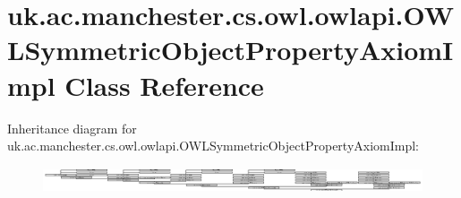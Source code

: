 \hypertarget{classuk_1_1ac_1_1manchester_1_1cs_1_1owl_1_1owlapi_1_1_o_w_l_symmetric_object_property_axiom_impl}{\section{uk.\-ac.\-manchester.\-cs.\-owl.\-owlapi.\-O\-W\-L\-Symmetric\-Object\-Property\-Axiom\-Impl Class Reference}
\label{classuk_1_1ac_1_1manchester_1_1cs_1_1owl_1_1owlapi_1_1_o_w_l_symmetric_object_property_axiom_impl}
}
Inheritance diagram for uk.\-ac.\-manchester.\-cs.\-owl.\-owlapi.\-O\-W\-L\-Symmetric\-Object\-Property\-Axiom\-Impl\-:\begin{figure}[H]
\begin{center}
\leavevmode
\includegraphics[height=0.765027cm]{classuk_1_1ac_1_1manchester_1_1cs_1_1owl_1_1owlapi_1_1_o_w_l_symmetric_object_property_axiom_impl}
\end{center}
\end{figure}
